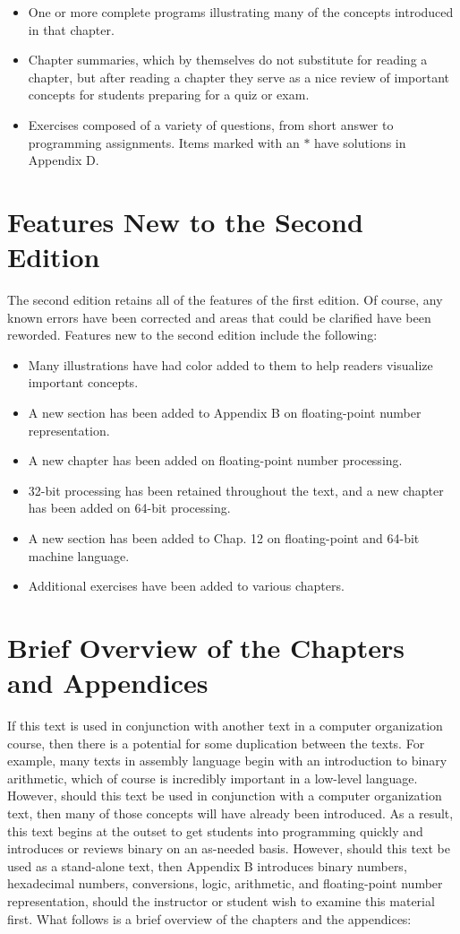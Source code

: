 \documentclass[10pt]{book}
\begin{document}
\begin{itemize}
  \item One or more complete programs illustrating many of the concepts introduced in that chapter.
  \item Chapter summaries, which by themselves do not substitute for reading a chapter, but after reading a chapter they serve as a nice review of important concepts for students preparing for a quiz or exam.
  \item Exercises composed of a variety of questions, from short answer to programming assignments. Items marked with an $*$ have solutions in Appendix D.
\end{itemize}


\section{Features New to the Second Edition}
The second edition retains all of the features of the first edition. Of course, any known errors have been corrected and areas that could be clarified have been reworded. Features new to the second edition include the following:

\begin{itemize}
  \item Many illustrations have had color added to them to help readers visualize important concepts.
  \item A new section has been added to Appendix B on floating-point number representation.
  \item A new chapter has been added on floating-point number processing.
  \item 32-bit processing has been retained throughout the text, and a new chapter has been added on 64-bit processing.
  \item A new section has been added to Chap. 12 on floating-point and 64-bit machine language.
  \item Additional exercises have been added to various chapters.
\end{itemize}

\section{Brief Overview of the Chapters and Appendices}
If this text is used in conjunction with another text in a computer organization course, then there is a potential for some duplication between the texts. For example, many texts in assembly language begin with an introduction to binary arithmetic, which of course is incredibly important in a low-level language. However, should this text be used in conjunction with a computer organization text, then many of those concepts will have already been introduced. As a result, this text begins at the outset to get students into programming quickly and introduces or reviews binary on an as-needed basis. However, should this text be used as a stand-alone text, then Appendix B introduces binary numbers, hexadecimal numbers, conversions, logic, arithmetic, and floating-point number representation, should the instructor or student wish to examine this material first. What follows is a brief overview of the chapters and the appendices:
\end{document}
